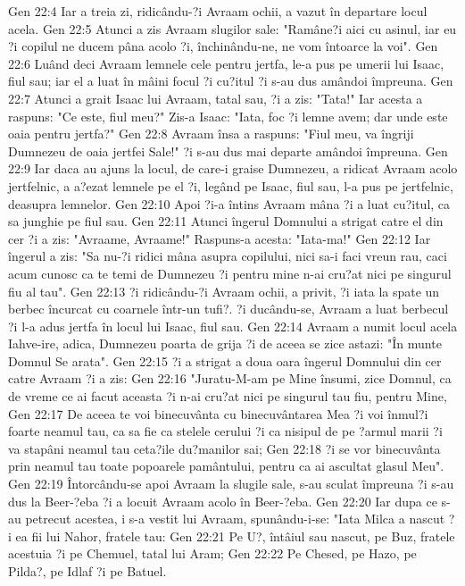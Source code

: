 Gen 22:4  Iar a treia zi, ridicându-?i Avraam ochii, a vazut în departare locul acela.
Gen 22:5  Atunci a zis Avraam slugilor sale: "Ramâne?i aici cu asinul, iar eu ?i copilul ne ducem pâna acolo ?i, închinându-ne, ne vom întoarce la voi".
Gen 22:6  Luând deci Avraam lemnele cele pentru jertfa, le-a pus pe umerii lui Isaac, fiul sau; iar el a luat în mâini focul ?i cu?itul ?i s-au dus amândoi împreuna.
Gen 22:7  Atunci a grait Isaac lui Avraam, tatal sau, ?i a zis: "Tata!" Iar acesta a raspuns: "Ce este, fiul meu?" Zis-a Isaac: "Iata, foc ?i lemne avem; dar unde este oaia pentru jertfa?"
Gen 22:8  Avraam însa a raspuns: "Fiul meu, va îngriji Dumnezeu de oaia jertfei Sale!" ?i s-au dus mai departe amândoi împreuna.
Gen 22:9  Iar daca au ajuns la locul, de care-i graise Dumnezeu, a ridicat Avraam acolo jertfelnic, a a?ezat lemnele pe el ?i, legând pe Isaac, fiul sau, l-a pus pe jertfelnic, deasupra lemnelor.
Gen 22:10  Apoi ?i-a întins Avraam mâna ?i a luat cu?itul, ca sa junghie pe fiul sau.
Gen 22:11  Atunci îngerul Domnului a strigat catre el din cer ?i a zis: "Avraame, Avraame!" Raspuns-a acesta: "Iata-ma!"
Gen 22:12  Iar îngerul a zis: "Sa nu-?i ridici mâna asupra copilului, nici sa-i faci vreun rau, caci acum cunosc ca te temi de Dumnezeu ?i pentru mine n-ai cru?at nici pe singurul fiu al tau".
Gen 22:13  ?i ridicându-?i Avraam ochii, a privit, ?i iata la spate un berbec încurcat cu coarnele într-un tufi?. ?i ducându-se, Avraam a luat berbecul ?i l-a adus jertfa în locul lui Isaac, fiul sau.
Gen 22:14  Avraam a numit locul acela Iahve-ire, adica, Dumnezeu poarta de grija ?i de aceea se zice astazi: "În munte Domnul Se arata".
Gen 22:15  ?i a strigat a doua oara îngerul Domnului din cer catre Avraam ?i a zis:
Gen 22:16  "Juratu-M-am pe Mine însumi, zice Domnul, ca de vreme ce ai facut aceasta ?i n-ai cru?at nici pe singurul tau fiu, pentru Mine,
Gen 22:17  De aceea te voi binecuvânta cu binecuvântarea Mea ?i voi înmul?i foarte neamul tau, ca sa fie ca stelele cerului ?i ca nisipul de pe ?armul marii ?i va stapâni neamul tau ceta?ile du?manilor sai;
Gen 22:18  ?i se vor binecuvânta prin neamul tau toate popoarele pamântului, pentru ca ai ascultat glasul Meu".
Gen 22:19  Întorcându-se apoi Avraam la slugile sale, s-au sculat împreuna ?i s-au dus la Beer-?eba ?i a locuit Avraam acolo în Beer-?eba.
Gen 22:20  Iar dupa ce s-au petrecut acestea, i s-a vestit lui Avraam, spunându-i-se: "Iata Milca a nascut ?i ea fii lui Nahor, fratele tau:
Gen 22:21  Pe U?, întâiul sau nascut, pe Buz, fratele acestuia ?i pe Chemuel, tatal lui Aram;
Gen 22:22  Pe Chesed, pe Hazo, pe Pilda?, pe Idlaf ?i pe Batuel.
